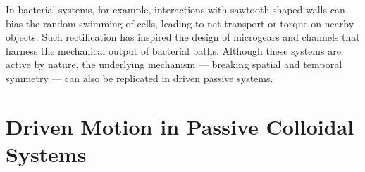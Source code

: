 In bacterial systems, for example, interactions with sawtooth-shaped walls can bias the random swimming of cells, leading to net transport or torque on nearby objects. Such rectification has inspired the design of microgears and channels that harness the mechanical output of bacterial baths. Although these systems are active by nature, the underlying mechanism — breaking spatial and temporal symmetry — can also be replicated in driven passive systems.


\section{Driven Motion in Passive Colloidal Systems}




\newpage
